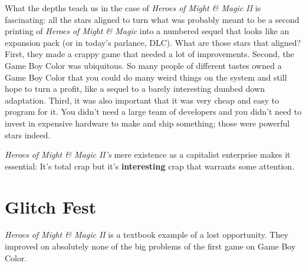 \documentclass{book}
\begin{document}
What the depths teach us in the case of \emph{Heroes of Might \& Magic II} is fascinating: all the stars aligned to turn what was probably meant to be a second printing of \emph{Heroes of Might \& Magic} into a numbered sequel that looks like an expansion pack (or in today’s parlance, DLC). What are those stars that aligned? First, they made a crappy game that needed a lot of improvements. Second, the Game Boy Color was ubiquitous. So many people of different tastes owned a Game Boy Color that you could do many weird things on the system and still hope to turn a profit, like a sequel to a barely interesting dumbed down adaptation. Third, it was also important that it was very cheap and easy to program for it. You didn’t need a large team of developers and you didn’t need to invest in expensive hardware to make and ship something; those were powerful stars indeed.

\emph{Heroes of Might \& Magic II’s} mere existence as a capitalist enterprise makes it essential: It’s total crap but it’s \textbf{interesting} crap that warrants some attention.

\FloatBarrier\needspace{5pt}\section*{Glitch Fest}\nopagebreak[4]

\emph{Heroes of Might \& Magic II} is a textbook example of a lost opportunity. They improved on absolutely none of the big problems of the first game on Game Boy Color.
\end{document}
